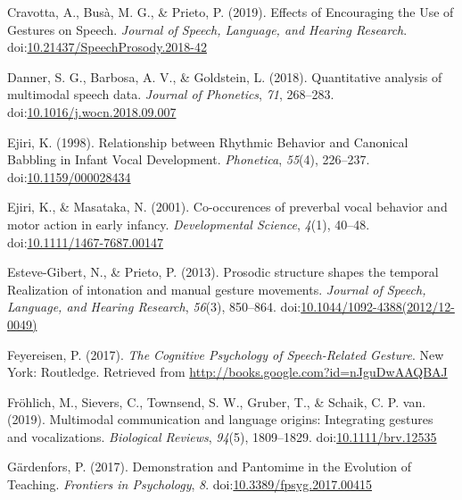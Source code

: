 \documentclass[
  man,floatsintext]{apa6}
\newlength{\cslhangindent}
\newenvironment{cslreferences}%
  {\setlength{\parindent}{0pt}%
  \everypar{\setlength{\hangindent}{\cslhangindent}}\ignorespaces}%
  {\par}
\begin{document}
\begin{cslreferences}
\leavevmode\hypertarget{ref-cravottaEffectsEncouragingUse2019}{}%
Cravotta, A., Busà, M. G., \& Prieto, P. (2019). Effects of Encouraging the Use of Gestures on Speech. \emph{Journal of Speech, Language, and Hearing Research}. doi:\href{https://doi.org/10.21437/SpeechProsody.2018-42}{10.21437/SpeechProsody.2018-42}

\leavevmode\hypertarget{ref-dannerQuantitativeAnalysisMultimodal2018}{}%
Danner, S. G., Barbosa, A. V., \& Goldstein, L. (2018). Quantitative analysis of multimodal speech data. \emph{Journal of Phonetics}, \emph{71}, 268--283. doi:\href{https://doi.org/10.1016/j.wocn.2018.09.007}{10.1016/j.wocn.2018.09.007}

\leavevmode\hypertarget{ref-ejiriRelationshipRhythmicBehavior1998}{}%
Ejiri, K. (1998). Relationship between Rhythmic Behavior and Canonical Babbling in Infant Vocal Development. \emph{Phonetica}, \emph{55}(4), 226--237. doi:\href{https://doi.org/10.1159/000028434}{10.1159/000028434}

\leavevmode\hypertarget{ref-ejiriCooccurencesPreverbalVocal2001}{}%
Ejiri, K., \& Masataka, N. (2001). Co-occurences of preverbal vocal behavior and motor action in early infancy. \emph{Developmental Science}, \emph{4}(1), 40--48. doi:\href{https://doi.org/10.1111/1467-7687.00147}{10.1111/1467-7687.00147}

\leavevmode\hypertarget{ref-esteve-gibertProsodicStructureShapes2013}{}%
Esteve-Gibert, N., \& Prieto, P. (2013). Prosodic structure shapes the temporal Realization of intonation and manual gesture movements. \emph{Journal of Speech, Language, and Hearing Research}, \emph{56}(3), 850--864. doi:\href{https://doi.org/10.1044/1092-4388(2012/12-0049)}{10.1044/1092-4388(2012/12-0049)}

\leavevmode\hypertarget{ref-feyereisenCognitivePsychologySpeechRelated2017}{}%
Feyereisen, P. (2017). \emph{The Cognitive Psychology of Speech-Related Gesture}. New York: Routledge. Retrieved from \url{http://books.google.com?id=nJguDwAAQBAJ}

\leavevmode\hypertarget{ref-frohlichMultimodalCommunicationLanguage2019}{}%
Fröhlich, M., Sievers, C., Townsend, S. W., Gruber, T., \& Schaik, C. P. van. (2019). Multimodal communication and language origins: Integrating gestures and vocalizations. \emph{Biological Reviews}, \emph{94}(5), 1809--1829. doi:\href{https://doi.org/10.1111/brv.12535}{10.1111/brv.12535}

\leavevmode\hypertarget{ref-gardenforsDemonstrationPantomimeEvolution2017}{}%
Gärdenfors, P. (2017). Demonstration and Pantomime in the Evolution of Teaching. \emph{Frontiers in Psychology}, \emph{8}. doi:\href{https://doi.org/10.3389/fpsyg.2017.00415}{10.3389/fpsyg.2017.00415}


\end{cslreferences}
\end{document}
